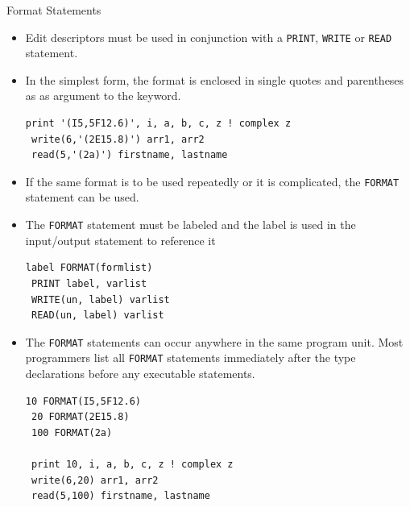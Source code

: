 \documentclass[c,mathserif,compress,xcolor=svgnames]{beamer}
\newcommand{\lstfortran}[1]{\lstinline[language={[90]Fortran},basicstyle=\footnotesize\ttfamily]|#1|}
\begin{document}
\begin{frame}{Format Statements}
  \begin{itemize}
    \item Edit descriptors must be used in conjunction with a \lstfortran{PRINT}, \lstfortran{WRITE} or \lstfortran{READ} statement.
    \item In the simplest form, the format is enclosed in single quotes and parentheses as as argument to the keyword.
      \begin{lstlisting}[language={[90]Fortran}]
 print '(I5,5F12.6)', i, a, b, c, z ! complex z
 write(6,'(2E15.8)') arr1, arr2
 read(5,'(2a)') firstname, lastname
      \end{lstlisting}
      \item If the same format is to be used repeatedly or it is complicated, the \lstfortran{FORMAT} statement can be used.
      \item The \lstfortran{FORMAT} statement must be labeled and the label is used in the input/output statement to reference it
        \begin{lstlisting}[language={[90]Fortran}]
 label FORMAT(formlist)
 PRINT label, varlist
 WRITE(un, label) varlist
 READ(un, label) varlist
        \end{lstlisting}
      \item The \lstfortran{FORMAT} statements can occur anywhere in the same program unit. Most programmers list all \lstfortran{FORMAT} statements immediately after the type declarations before any executable statements.
        \begin{lstlisting}[language={[90]Fortran}]
 10 FORMAT(I5,5F12.6)
 20 FORMAT(2E15.8)
 100 FORMAT(2a)
 
 print 10, i, a, b, c, z ! complex z
 write(6,20) arr1, arr2
 read(5,100) firstname, lastname
        \end{lstlisting}
  \end{itemize}
\end{frame}
\end{document}
